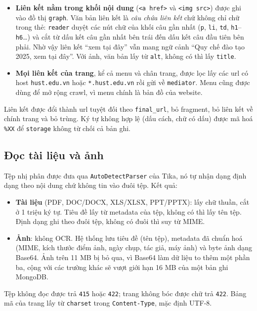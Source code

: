 \documentclass[12pt,a4paper]{report}
\begin{document}
\begin{itemize}
  \item \textbf{Liên kết nằm trong khối nội dung} (\texttt{<a href>} và \texttt{<img src>}) được ghi vào đồ thị
        \texttt{graph}. Văn bản liên kết là \emph{câu chứa liên kết} chứ không chỉ chữ trong thẻ: \texttt{reader} duyệt
        các nút chữ của khối câu gần nhất (\texttt{p}, \texttt{li}, \texttt{td}, \texttt{h1}--\texttt{h6}\ldots) và cắt
        từ dấu kết câu gần nhất bên trái đến dấu kết câu đầu tiên bên phải. Nhờ vậy liên kết ``xem tại đây'' vẫn mang
        ngữ cảnh ``Quy chế đào tạo 2025, xem tại đây''. Với ảnh, văn bản lấy từ \texttt{alt}, không có thì lấy
        \texttt{title}.
  \item \textbf{Mọi liên kết của trang}, kể cả menu và chân trang, được lọc lấy các url có host \texttt{hust.edu.vn}
        hoặc \texttt{*.hust.edu.vn} rồi gửi về \texttt{mediator}. Menu cũng được dùng để mở rộng crawl, vì menu chính
        là bản đồ của website.
\end{itemize}

Liên kết được đổi thành url tuyệt đối theo \texttt{final\_\allowbreak{}url}, bỏ fragment, bỏ liên kết về chính trang và bỏ trùng. Ký
tự không hợp lệ (dấu cách, chữ có dấu) được mã hoá \texttt{\%XX} để \texttt{storage} không từ chối cả bản ghi.

\subsection{Đọc tài liệu và ảnh}

Tệp nhị phân được đưa qua \texttt{AutoDetectParser} của Tika, nó tự nhận dạng định dạng theo nội dung chứ không tin vào
đuôi tệp. Kết quả:

\begin{itemize}
  \item \textbf{Tài liệu} (PDF, DOC/DOCX, XLS/XLSX, PPT/PPTX): lấy chữ thuần, cắt ở 1 triệu ký tự. Tiêu đề lấy từ
        metadata của tệp, không có thì lấy tên tệp. Định dạng ghi theo đuôi tệp, không có đuôi thì suy từ MIME.
  \item \textbf{Ảnh}: không OCR. Hệ thống lưu tiêu đề (tên tệp), metadata đã chuẩn hoá (MIME, kích thước điểm ảnh, ngày
        chụp, tác giả, máy ảnh) và byte ảnh dạng Base64. Ảnh trên 11 MB bị bỏ qua, vì Base64 làm dữ liệu to thêm một
        phần ba, cộng với các trường khác sẽ vượt giới hạn 16 MB của một bản ghi MongoDB.
\end{itemize}

Tệp không đọc được trả \texttt{415} hoặc \texttt{422}; trang không bóc được chữ trả \texttt{422}. Bảng mã của trang lấy
từ \texttt{charset} trong \texttt{Content-Type}, mặc định UTF-8.
\end{document}
